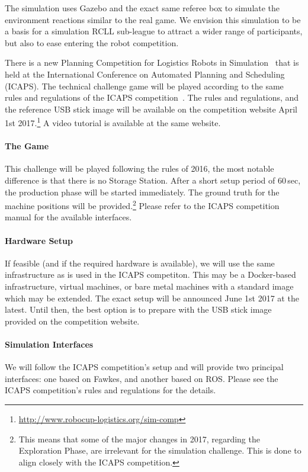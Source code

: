 \documentclass[12pt,twoside]{article}
\begin{document}
The simulation uses Gazebo and the exact same referee box to simulate
the environment reactions similar to the real game. We envision this
simulation to be a basis for a simulation RCLL sub-league to attract a
wider range of participants, but also to ease entering the robot
competition.

There is a new Planning Competition for Logistics Robots in
Simulation~\cite{LogRobComp2016} that is held at the International
Conference on Automated Planning and Scheduling (ICAPS). The technical
challenge game will be played according to the same rules and
regulations of the ICAPS competition~\cite{LogRobComp-Rules-2017}. The
rules and regulations, and the reference USB stick image will be
available on the competition website April 1st
2017.\footnote{\url{http://www.robocup-logistics.org/sim-comp}} A
video tutorial is available at the same website.

\vspace{-2ex}\paragraph{The Game}
%
This challenge will be played following the rules of 2016, the most
notable difference is that there is no Storage Station. After a short
setup period of 60\,sec, the production phase will be started
immediately. The ground truth for the machine positions will be
provided.\footnote{This means that some of the major changes in 2017,
  regarding the Exploration Phase, are irrelevant for the simulation
  challenge. This is done to align closely with the ICAPS
  competition.} Please refer to the ICAPS competition manual for the
available interfaces.

\vspace{-2ex}\paragraph{Hardware Setup}
%
If feasible (and if the required hardware is available), we will use
the same infrastructure as is used in the ICAPS competiton. This may be a
Docker-based
infrastructure, virtual machines, or bare metal machines with a
standard image which may be extended. The exact setup will be
announced June 1st 2017 at the latest. Until then, the best option is
to prepare with the USB stick image provided on the competition
website.

\vspace{-2ex}\paragraph{Simulation Interfaces}
%
We will follow the ICAPS competition's setup and will provide two
principal interfaces: one based on Fawkes, and another based on
ROS. Please see the ICAPS competition's rules and regulations for the
details.
\end{document}
